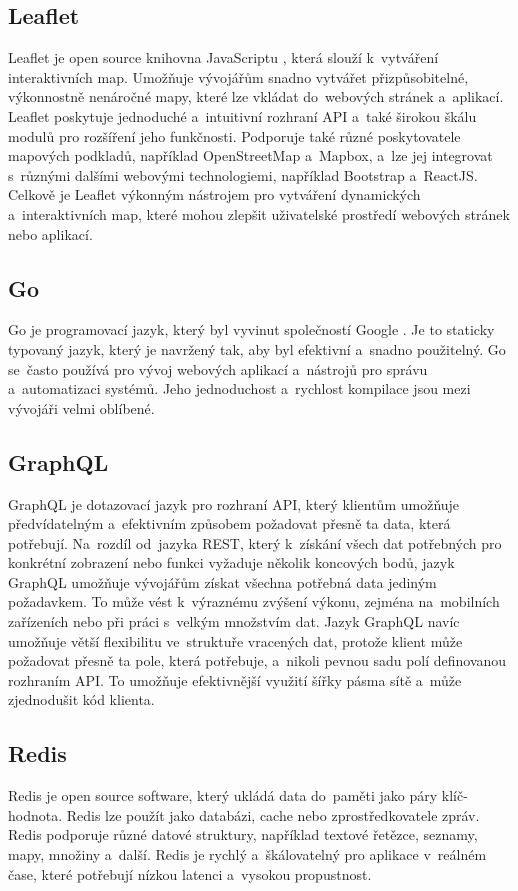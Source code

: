 \subsection{Leaflet} Leaflet je open source knihovna JavaScriptu \cite{leaflet}, která slouží k~vytváření interaktivních map. Umožňuje vývojářům snadno vytvářet přizpůsobitelné, výkonnostně nenáročné mapy, které lze vkládat do~webových stránek a~aplikací. Leaflet poskytuje jednoduché a~intuitivní rozhraní API a~také širokou škálu modulů pro rozšíření jeho funkčnosti. Podporuje také různé poskytovatele mapových podkladů, například OpenStreetMap a~Mapbox, a~lze jej integrovat s~různými dalšími webovými technologiemi, například Bootstrap a~ReactJS. Celkově je Leaflet výkonným nástrojem pro vytváření dynamických a~interaktivních map, které mohou zlepšit uživatelské prostředí webových stránek nebo aplikací.
\subsection{Go} Go je programovací jazyk, který byl vyvinut společností Google \cite{go}. Je to staticky typovaný jazyk, který je navržený tak, aby byl efektivní a~snadno použitelný. Go se~často používá pro vývoj webových aplikací a~nástrojů pro správu a~automatizaci systémů. Jeho jednoduchost a~rychlost kompilace jsou mezi vývojáři velmi oblíbené.

\subsection{GraphQL}\label{graphql} GraphQL \cite{graphql} je dotazovací jazyk pro rozhraní API, který klientům umožňuje předvídatelným a~efektivním způsobem požadovat přesně ta data, která potřebují. Na~rozdíl od~jazyka REST, který k~získání všech dat potřebných pro konkrétní zobrazení nebo funkci vyžaduje několik koncových bodů, jazyk GraphQL umožňuje vývojářům získat všechna potřebná data jediným požadavkem. To může vést k~výraznému zvýšení výkonu, zejména na~mobilních zařízeních nebo při práci s~velkým množstvím dat. Jazyk GraphQL navíc umožňuje větší flexibilitu ve~struktuře vracených dat, protože klient může požadovat přesně ta pole, která potřebuje, a~nikoli pevnou sadu polí definovanou rozhraním API. To umožňuje efektivnější využití šířky pásma sítě a~může zjednodušit kód klienta.
\subsection{Redis}\label{redis} Redis je open source software, který ukládá data do~paměti jako páry klíč-hodnota. Redis lze použít jako databázi, cache nebo zprostředkovatele zpráv. Redis podporuje různé datové struktury, například textové řetězce, seznamy, mapy, množiny a~další. Redis je rychlý a~škálovatelný pro aplikace v~reálném čase, které potřebují nízkou latenci a~vysokou propustnost. \cite{redis}

